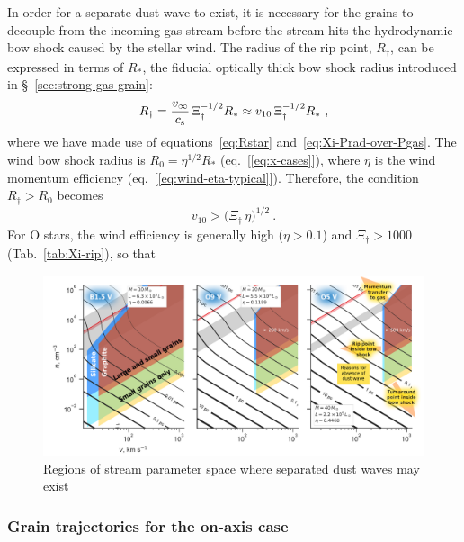 In order for a separate dust wave to exist, it is necessary for the
grains to decouple from the incoming gas stream before the stream hits
the hydrodynamic bow shock caused by the stellar wind.  The radius of
the rip point, \(R_\dag\), can be expressed in terms of \(R_*\), the
fiducial optically thick bow shock radius introduced in
\S~\ref{sec:strong-gas-grain}:
\begin{equation}
  \label{eq:Rdag-over-Rstar}
  R_\dag = \frac{v_\infty}{c_{\text{s}}}\, \Xi_\dag^{-1/2} R_* \approx v_{10}\, \Xi_\dag^{-1/2} R_* \ ,
\end{equation}
where we have made use of equations~\eqref{eq:Rstar}
and~\eqref{eq:Xi-Prad-over-Pgas}.  The wind bow shock radius is
\(R_0 = \eta^{1/2} R_*\) (eq.~[\ref{eq:x-cases}]), where \(\eta\) is the
wind momentum efficiency (eq.~[\ref{eq:wind-eta-typical}]).
Therefore, the condition \(R_\dag > R_0\) becomes
\begin{equation}
  \label{eq:dust-wave-velocity-condition}
  v_{10} > \bigl( \Xi_\dag \, \eta \bigr)^{1/2} \ . 
\end{equation}
For O stars, the wind efficiency is generally high (\(\eta > 0.1\)) and
\(\Xi_\dag > 1000\) (Tab.~\ref{tab:Xi-rip}), so that 

\begin{figure}
  \centering
  \includegraphics[width=\linewidth]{figs/existence-dust-wave}
  \caption{Regions of stream parameter space where separated dust waves may exist}
  \label{fig:existence-dust-wave}
\end{figure}

\subsubsection{Grain trajectories for the on-axis case}
\label{sec:grain-traj-axis}

